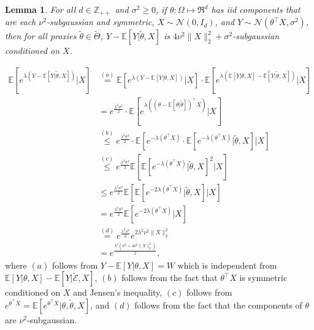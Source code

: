 \documentclass[twoside,11pt]{article}
\renewenvironment{proof}{\par\noindent{\bf Proof\ }}{\hfill\BlackBox\\[2mm]}
\newenvironment{proof}{\par\noindent{\bf Proof\ }}{\hfill\BlackBox\\[2mm]}
\newtheorem{lemma}[theorem]{Lemma}
\def\environment{\mathcal{E}}
\def\proxy{\tilde{\environment}}
\def\proxyset{\tilde{\Theta}}
\def\normal{\mathcal{N}}
\def\proxytheta{\tilde{\theta}}
\def\subgauss{\nu^2}
\def\E{\mathbb{E}}
\begin{document}
\begin{lemma}
    \label{le:subgaussian1}
    For all $d \in \mathbb{Z}_{++}$ and $\sigma^2 \geq 0$, if $\theta:\Omega\mapsto\Re^d$ has iid components that are each $\subgauss$-subgaussian and symmetric, $X\sim\normal(0, I_d)$, and $Y \sim \normal(\theta^\top X, \sigma^2)$, then for all proxies $\proxytheta\in\proxyset$, $Y-\E[Y|\proxytheta, X]$ is $4\subgauss\|X\|^2_2 + \sigma^2$-subgaussian conditioned on $X$. 
\end{lemma}
\begin{proof}
    \begin{align*}
        \E\left[e^{\lambda(Y-\E[Y|\proxytheta, X])}\big|X\right]
        & \overset{(a)}{=} \E\left[e^{\lambda\left(Y-\E[Y|\theta,X]\right)}\big|X\right]\cdot\E\left[e^{\lambda\left(\E[Y|\theta,X] - \E[Y|\proxytheta, X]\right)}\big|X\right]\\
        & = e^{\frac{\lambda^2\sigma^2}{2}}\cdot\E\left[e^{\lambda\left((\theta-\E[\theta|\proxytheta])^\top X\right)}\big| X\right]\\
        & \overset{(b)}{\leq} e^{\frac{\lambda^2\sigma^2}{2}}\cdot\E\left[e^{-\lambda(\theta^\top X)}\cdot\E\left[e^{-\lambda(\theta^\top X)}|\proxytheta,X\right]\big|X\right]\\
        & \overset{(c)}{\leq} e^{\frac{\lambda^2\sigma^2}{2}}\E\left[\E[e^{-\lambda(\theta^\top X)}|\proxytheta, X]^2\big|X\right]\\
        &\leq e^{\frac{\lambda^2\sigma^2}{2}}\E\left[\E[e^{-2\lambda(\theta^\top X)}|\proxytheta, X]\big|X\right]\\
        & =e^{\frac{\lambda^2\sigma^2}{2}}\E\left[e^{-2\lambda(\theta^\top X)}\big|X\right]\\
        & \overset{(d)}{=}e^{\frac{\lambda^2\sigma^2}{2}}e^{2\lambda^2\subgauss\|X\|^2_2}\\
        & = e^{\frac{\lambda^2\left(\sigma^2+4\subgauss\|X\|^2_2\right)}{2}},
    \end{align*}
    where $(a)$ follows from $Y-\E[Y|\theta,X] = W$ which is independent from $\E[Y|\theta,X]-\E[Y|\proxy,X]$, $(b)$ follows from the fact that $\theta^\top X$ is symmetric conditioned on $X$ and Jensen's inequality, $(c)$ follows from $e^{\theta^\top X} = \E[e^{\theta^\top X}|\theta,\proxytheta, X]$, and $(d)$ follows from the fact that the components of $\theta$ are $\subgauss$-subgaussian.
\end{proof}
\end{document}
